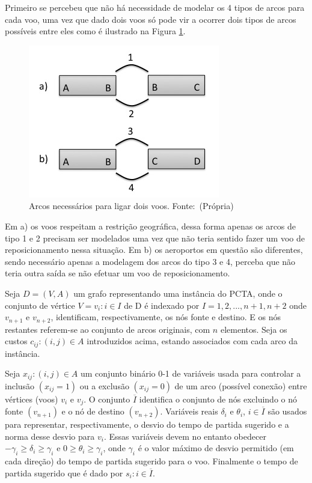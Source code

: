 Primeiro se percebeu que não há necessidade de modelar os 4 tipos de arcos para
cada voo, uma vez que dado dois voos só pode vir a ocorrer dois tipos de arcos
possíveis entre eles como é ilustrado na Figura \ref{fig:modelagem_arcos}.

\begin{figure}[ht]
	\centering
	\caption{Arcos necessários para ligar dois voos. \mbox{Fonte:
	(Própria)}}\label{fig:modelagem_arcos}
	\includegraphics[scale=0.4]{./img/modelagem_arcos}
\end{figure}


Em a) os voos respeitam a restrição geográfica, dessa forma apenas os arcos de
tipo 1 e 2 precisam ser modelados uma vez que não teria sentido fazer um voo de
reposicionamento nessa situação. Em b) os aeroportos em questão são diferentes,
sendo necessário apenas a modelagem dos arcos do tipo 3 e 4, perceba que não
teria outra saída se não efetuar um voo de reposicionamento.


Seja $D = (V,A)$ um grafo representando uma instância do PCTA, onde o conjunto
de vértice $V = {v_{i}:i \in I}$ de D é indexado por $I = {1, 2, ..., n+1,
n+2}$ onde $v_{n+1}$ e $v_{n+2}$, identificam, respectivamente, os nós fonte e
destino. E os nós restantes referem-se ao conjunto de arcos originais, com $n$
elementos. Seja os custos ${c_{ij}:(i,j) \in A}$ introduzidos acima, estando
associados com cada arco da instância.
  
Seja ${x_{ij}:(i,j) \in A}$ um conjunto binário 0-1 de variáveis usada para
controlar a inclusão $(x_{ij} = 1)$ ou a exclusão $(x_{ij} = 0)$ de um arco
(possível conexão) entre vértices (voos) $v_{i}$ e $v_{j}$. O conjunto
$\overline{I}$ identifica o conjunto de nós excluindo o nó fonte $(v_{n+1})$ e
o nó de destino $(v_{n+2})$. Variáveis reais $\delta_{i}$ e $\theta_{i}$, $i
\in \overline{I}$ são usados para representar, respectivamente, o desvio do
tempo de partida sugerido e a norma desse desvio para $v_{i}$. Essas variáveis
devem no entanto obedecer $-\gamma_{i} \geq \delta_{i} \geq \gamma_{i}$ e $0
\geq \theta_{i} \geq \gamma_{i}$, onde $\gamma_{i}$ é o valor máximo de desvio
permitido (em cada direção) do tempo de partida sugerido para o voo. Finalmente
o tempo de partida sugerido que é dado por $s_{i}:i \in \overline{I}$.
  
